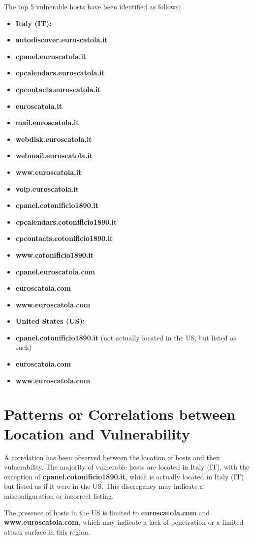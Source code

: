 The top 5 vulnerable hosts have been identified as follows:
\begin{itemize}
\item \textbf{Italy (IT):}
\item \textbf{autodiscover.euroscatola.it}
\item \textbf{cpanel.euroscatola.it}
\item \textbf{cpcalendars.euroscatola.it}
\item \textbf{cpcontacts.euroscatola.it}
\item \textbf{euroscatola.it}
\item \textbf{mail.euroscatola.it}
\item \textbf{webdisk.euroscatola.it}
\item \textbf{webmail.euroscatola.it}
\item \textbf{www.euroscatola.it}
\item \textbf{voip.euroscatola.it}
\item \textbf{cpanel.cotonificio1890.it}
\item \textbf{cpcalendars.cotonificio1890.it}
\item \textbf{cpcontacts.cotonificio1890.it}
\item \textbf{www.cotonificio1890.it}
\item \textbf{cpanel.euroscatola.com}
\item \textbf{euroscatola.com}
\item \textbf{www.euroscatola.com}
\item \textbf{United States (US):}
\item \textbf{cpanel.cotonificio1890.it} (not actually located in the US, but listed as such)
\item \textbf{euroscatola.com}
\item \textbf{www.euroscatola.com}
\end{itemize}
\section{Patterns or Correlations between Location and Vulnerability}

A correlation has been observed between the location of hosts and their vulnerability. The majority of vulnerable hosts are located in Italy (IT), with the exception of \textbf{cpanel.cotonificio1890.it}, which is actually located in Italy (IT) but listed as if it were in the US. This discrepancy may indicate a misconfiguration or incorrect listing.

The presence of hosts in the US is limited to \textbf{euroscatola.com} and \textbf{www.euroscatola.com}, which may indicate a lack of penetration or a limited attack surface in this region.


